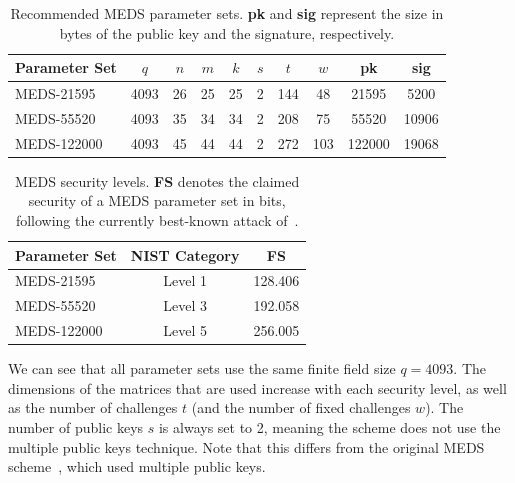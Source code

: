 \documentclass[11pt,a4paper]{report}
\theoremstyle{definition}
\begin{document}
\begin{table}
  \centering
  \caption{Recommended MEDS parameter sets. \textbf{pk} and \textbf{sig} represent the size in bytes of the public key and the signature, respectively.}
  \begin{tabular}{lccccccccc}
    \toprule
    \textbf{Parameter Set} & \textbf{$q$} & \textbf{$n$} & \textbf{$m$} & \textbf{$k$} & \textbf{$s$} & \textbf{$t$} & \textbf{$w$} & \textbf{pk} & \textbf{sig} \\
    \midrule
    MEDS-21595             & 4093         & 26           & 25           & 25           & 2            & 144          & 48           & 21595       & 5200         \\
    MEDS-55520             & 4093         & 35           & 34           & 34           & 2            & 208          & 75           & 55520       & 10906        \\
    MEDS-122000            & 4093         & 45           & 44           & 44           & 2            & 272          & 103          & 122000      & 19068        \\
    \bottomrule
  \end{tabular}
  \label{tab:medsparametersets}
\end{table}

\begin{table}
  \centering
  \caption{MEDS security levels. \textbf{FS} denotes the claimed security of a MEDS parameter set in bits, following the currently best-known attack of~\cite{kumar2024algorithms}.}
  \begin{tabular}{lcc}
    \toprule
    \textbf{Parameter Set} & \textbf{NIST Category} & \textbf{FS} \\
    \midrule
    MEDS-21595             & Level 1                & 128.406     \\
    MEDS-55520             & Level 3                & 192.058     \\
    MEDS-122000            & Level 5                & 256.005     \\
    \bottomrule
  \end{tabular}
  \label{tab:medssecuritylevels}
\end{table}

We can see that all parameter sets use the same finite field size $q = 4093$. The dimensions of the matrices that are used increase with each security level, as well as the number of challenges $t$ (and the number of fixed challenges $w$). The number of public keys $s$ is always set to 2, meaning the scheme does not use the multiple public keys technique. Note that this differs from the original MEDS scheme~\cite{chou2023meds}, which used multiple public keys.
\end{document}
